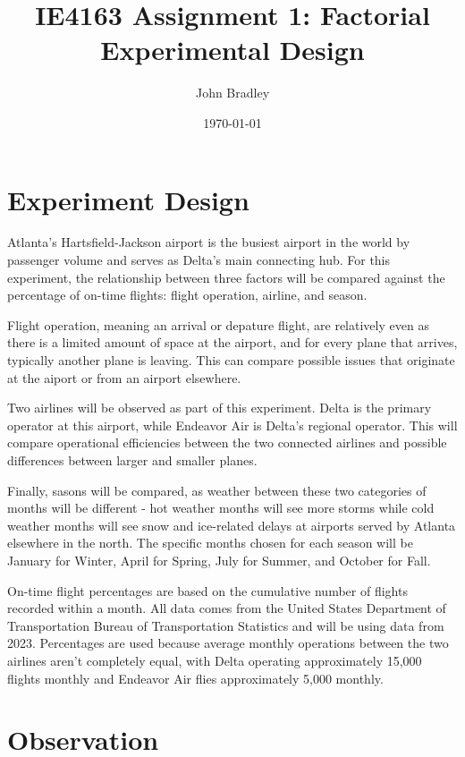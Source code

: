\documentclass{article}
\title{IE4163 Assignment 1: Factorial Experimental Design}
\author{John Bradley}
\date{\today}
\begin{document}
  \maketitle

  \section{Experiment Design}

  Atlanta's Hartsfield-Jackson airport is the busiest airport in the world by
  passenger volume and serves as Delta's main connecting hub. For this
  experiment, the relationship between three factors will be compared against
  the percentage of on-time flights: flight operation, airline, and season.

  Flight operation, meaning an arrival or depature flight, are relatively even
  as there is a limited amount of space at the airport, and for every plane
  that arrives, typically another plane is leaving. This can compare possible
  issues that originate at the aiport or from an airport elsewhere.

  Two airlines will be observed as part of this experiment. Delta is the
  primary operator at this airport, while Endeavor Air is Delta's regional
  operator. This will compare operational efficiencies between the two
  connected airlines and possible differences between larger and smaller 
  planes.

  Finally, sasons will be compared, as weather between these two
  categories of months will be different - hot weather months will see more
  storms while cold weather months will see snow and ice-related delays at
  airports served by Atlanta elsewhere in the north. The specific months chosen
  for each season will be January for Winter, April for Spring, July for
  Summer, and October for Fall.

  On-time flight percentages are based on the cumulative number of flights
  recorded within a month. All data comes from the United States Department of
  Transportation Bureau of Transportation Statistics and will be using data
  from 2023. Percentages are used because average monthly operations between
  the two airlines aren't completely equal, with Delta operating approximately
  15,000 flights monthly and Endeavor Air flies approximately 5,000 monthly.

  \section{Observation}
  
\end{document}
